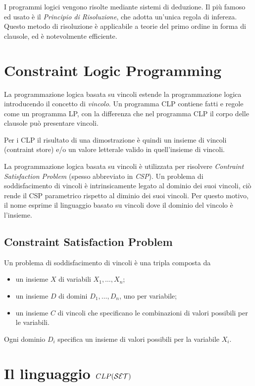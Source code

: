 \documentclass[12pt,a4paper,openright]{book} %
\begin{document}
I programmi logici vengono risolte mediante sistemi di deduzione. Il più famoso ed usato è il \emph{Principio di Risoluzione}, che adotta un'unica regola di infereza. Questo metodo di risoluzione è applicabile a teorie del primo ordine in forma di clausole, ed è notevolmente efficiente.

\section{Constraint Logic Programming}
\label{sec:constraint_logic_programming}

La programmazione logica basata su vincoli estende la programmazione logica introducendo il concetto di \emph{vincolo}. Un programma CLP contiene fatti e regole come un programma LP, con la differenza che nel programma CLP il corpo delle clausole può presentare vincoli.

Per i CLP il risultato di una dimostrazione è quindi un insieme di vincoli (contraint store) e/o un valore letterale valido in quell'insieme di vincoli.

La programmazione logica basata su vincoli è utilizzata per risolvere \emph{Contraint Satisfaction Problem} (spesso abbreviato in \emph{CSP}). Un problema di soddisfacimento di vincoli è intrinsicamente legato al dominio dei suoi vincoli, ciò rende il CSP parametrico rispetto al diminio dei suoi vincoli. Per questo motivo, il nome \clpset{} esprime il linguaggio basato su vincoli  dove il dominio del vincolo è l'insieme.

\subsection{Constraint Satisfaction Problem}
\label{sec:constraint_satisfaction_problem}

Un problema di soddisfacimento di vincoli è una tripla composta da
\begin{itemize}
\item un insieme $X$ di variabili ${X_1, \ldots, X_n}$;
\item un insieme $D$ di domini ${D_1, \ldots, D_n}$, uno per variabile;
\item un insieme $C$ di vincoli che specificano le combinazioni di valori possibili per le variabili.
\end{itemize}

Ogni dominio $D_i$ specifica un insieme di valori possibili per la variabile $X_i$.

\section{Il linguaggio $CLP(\mathcal{S}\mathcal{E}\mathcal{T})$}
\label{sec:lang_clpset}
\end{document}
